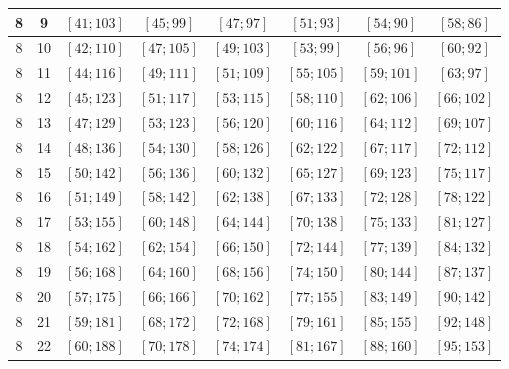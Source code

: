 \documentclass[a4paper,12pt]{article}
\begin{document}
\begin{center}
{\begin{longtable}[H]{|c|c|c|c|c|c|c|c|}
8 &  9 &  $\left[ 41; 103\right]$ &  $\left[ 45; 99\right]$ &  $\left[ 47; 97\right]$ &  $\left[ 51; 93\right]$ &  $\left[ 54; 90\right]$ &  $\left[ 58; 86\right]$ \tabularnewline \hline
8 &  10 &  $\left[ 42; 110\right]$ &  $\left[ 47; 105\right]$ &  $\left[ 49; 103\right]$ &  $\left[ 53; 99\right]$ &  $\left[ 56; 96\right]$ &  $\left[ 60; 92\right]$ \tabularnewline \hline
8 &  11 &  $\left[ 44; 116\right]$ &  $\left[ 49; 111\right]$ &  $\left[ 51; 109\right]$ &  $\left[ 55; 105\right]$ &  $\left[ 59; 101\right]$ &  $\left[ 63; 97\right]$ \tabularnewline \hline
8 &  12 &  $\left[ 45; 123\right]$ &  $\left[ 51; 117\right]$ &  $\left[ 53; 115\right]$ &  $\left[ 58; 110\right]$ &  $\left[ 62; 106\right]$ &  $\left[ 66; 102\right]$ \tabularnewline \hline
8 &  13 &  $\left[ 47; 129\right]$ &  $\left[ 53; 123\right]$ &  $\left[ 56; 120\right]$ &  $\left[ 60; 116\right]$ &  $\left[ 64; 112\right]$ &  $\left[ 69; 107\right]$ \tabularnewline \hline
8 &  14 &  $\left[ 48; 136\right]$ &  $\left[ 54; 130\right]$ &  $\left[ 58; 126\right]$ &  $\left[ 62; 122\right]$ &  $\left[ 67; 117\right]$ &  $\left[ 72; 112\right]$ \tabularnewline \hline
8 &  15 &  $\left[ 50; 142\right]$ &  $\left[ 56; 136\right]$ &  $\left[ 60; 132\right]$ &  $\left[ 65; 127\right]$ &  $\left[ 69; 123\right]$ &  $\left[ 75; 117\right]$ \tabularnewline \hline
8 &  16 &  $\left[ 51; 149\right]$ &  $\left[ 58; 142\right]$ &  $\left[ 62; 138\right]$ &  $\left[ 67; 133\right]$ &  $\left[ 72; 128\right]$ &  $\left[ 78; 122\right]$ \tabularnewline \hline
8 &  17 &  $\left[ 53; 155\right]$ &  $\left[ 60; 148\right]$ &  $\left[ 64; 144\right]$ &  $\left[ 70; 138\right]$ &  $\left[ 75; 133\right]$ &  $\left[ 81; 127\right]$ \tabularnewline \hline
8 &  18 &  $\left[ 54; 162\right]$ &  $\left[ 62; 154\right]$ &  $\left[ 66; 150\right]$ &  $\left[ 72; 144\right]$ &  $\left[ 77; 139\right]$ &  $\left[ 84; 132\right]$ \tabularnewline \hline
8 &  19 &  $\left[ 56; 168\right]$ &  $\left[ 64; 160\right]$ &  $\left[ 68; 156\right]$ &  $\left[ 74; 150\right]$ &  $\left[ 80; 144\right]$ &  $\left[ 87; 137\right]$ \tabularnewline \hline
8 &  20 &  $\left[ 57; 175\right]$ &  $\left[ 66; 166\right]$ &  $\left[ 70; 162\right]$ &  $\left[ 77; 155\right]$ &  $\left[ 83; 149\right]$ &  $\left[ 90; 142\right]$ \tabularnewline \hline
8 &  21 &  $\left[ 59; 181\right]$ &  $\left[ 68; 172\right]$ &  $\left[ 72; 168\right]$ &  $\left[ 79; 161\right]$ &  $\left[ 85; 155\right]$ &  $\left[ 92; 148\right]$ \tabularnewline \hline
8 &  22 &  $\left[ 60; 188\right]$ &  $\left[ 70; 178\right]$ &  $\left[ 74; 174\right]$ &  $\left[ 81; 167\right]$ &  $\left[ 88; 160\right]$ &  $\left[ 95; 153\right]$ \tabularnewline \hline

\end{longtable}}
\end{center}
\end{document}
